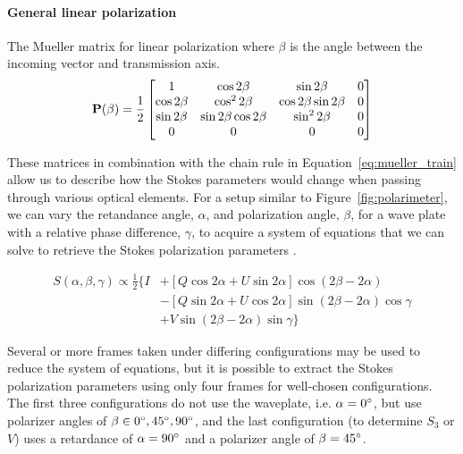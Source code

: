 \paragraph*{General linear polarization}
The Mueller matrix for linear polarization where $\beta$ is the angle between the incoming vector and transmission axis.
\begin{equation}
    \mathbf{P}(\beta) = \frac{1}{2}
    \begin{bmatrix}
        1            & \cos 2 \beta              & \sin 2 \beta              & 0 \\
        \cos 2 \beta & \cos^{2} 2 \beta          & \cos 2 \beta \sin 2 \beta & 0 \\
        \sin 2 \beta & \sin 2 \beta \cos 2 \beta & \sin^{2} 2 \beta          & 0 \\
        0            & 0                         & 0                         & 0 \\
    \end{bmatrix}
    \label{matrix:polarizer}
\end{equation}
\prgph

These matrices in combination with the chain rule in Equation~\ref{eq:mueller_train} allow us to describe how the Stokes parameters would change when passing through various optical elements. For a setup similar to Figure~\ref{fig:polarimeter}, we can vary the retandance angle, $\alpha$, and polarization angle, $\beta$, for a wave plate with a relative phase difference, $\gamma$, to acquire a system of equations that we can solve to retrieve the Stokes polarization parameters \citep{waveplate_in_specpol}.

\begin{equation}
    \begin{split}
        S(\alpha, \beta, \gamma) \propto \frac{1}{2} \{ I & + [Q \cos2\alpha + U \sin2\alpha] \cos(2\beta - 2\alpha) \\
        & - [Q \sin2\alpha + U \cos2\alpha] \sin(2\beta - 2\alpha) \cos\gamma \label{eq:Stokes_intensity} \\
        & + V \sin(2\beta - 2\alpha)\sin\gamma \}
    \end{split}
\end{equation}

Several or more frames taken under differing configurations may be used to reduce the system of equations, but it is possible to extract the Stokes polarization parameters using only four frames for well-chosen configurations. The first three configurations do not use the waveplate, i.e. $\alpha = 0\hbox{$^\circ$}$, but use polarizer angles of $\beta \in {0\hbox{$^\circ$}, 45\hbox{$^\circ$}, 90\hbox{$^\circ$}}$, and the last configuration (to determine $S_{3}$ or $V$) uses a retardance of $\alpha = 90\hbox{$^\circ$}$ and a polarizer angle of $\beta = 45\hbox{$^\circ$}$.
\prgph


